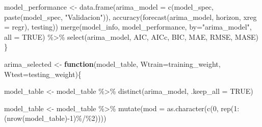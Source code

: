 \documentclass[
]{article}
\newenvironment{Shaded}{\begin{snugshade}}{\end{snugshade}}
\newcommand{\AttributeTok}[1]{\textcolor[rgb]{0.77,0.63,0.00}{#1}}
\newcommand{\ConstantTok}[1]{\textcolor[rgb]{0.00,0.00,0.00}{#1}}
\newcommand{\ControlFlowTok}[1]{\textcolor[rgb]{0.13,0.29,0.53}{\textbf{#1}}}
\newcommand{\DecValTok}[1]{\textcolor[rgb]{0.00,0.00,0.81}{#1}}
\newcommand{\FunctionTok}[1]{\textcolor[rgb]{0.00,0.00,0.00}{#1}}
\newcommand{\NormalTok}[1]{#1}
\newcommand{\OtherTok}[1]{\textcolor[rgb]{0.56,0.35,0.01}{#1}}
\newcommand{\SpecialCharTok}[1]{\textcolor[rgb]{0.00,0.00,0.00}{#1}}
\newcommand{\StringTok}[1]{\textcolor[rgb]{0.31,0.60,0.02}{#1}}
\begin{document}
\begin{Shaded}
\begin{Highlighting}[]
\NormalTok{        model\_performance }\OtherTok{\textless{}{-}} \FunctionTok{data.frame}\NormalTok{(}\AttributeTok{arima\_model =} \FunctionTok{c}\NormalTok{(model\_spec, }
                                                        \FunctionTok{paste}\NormalTok{(model\_spec,}
                                                              \StringTok{"Validacion"}\NormalTok{)),}
                                        \FunctionTok{accuracy}\NormalTok{(}\FunctionTok{forecast}\NormalTok{(arima\_model, horizon, }
                                                          \AttributeTok{xreg =}\NormalTok{ regr),}
\NormalTok{                                                 testing))}
        \FunctionTok{merge}\NormalTok{(model\_info, model\_performance, }\AttributeTok{by=}\StringTok{"arima\_model"}\NormalTok{, }\AttributeTok{all =} \ConstantTok{TRUE}\NormalTok{) }\SpecialCharTok{\%\textgreater{}\%}
            \FunctionTok{select}\NormalTok{(arima\_model, AIC, AICc, BIC, MAE, RMSE, MASE)}
\NormalTok{    \}}

\NormalTok{    arima\_selected }\OtherTok{\textless{}{-}} \ControlFlowTok{function}\NormalTok{(model\_table, }\AttributeTok{Wtrain=}\NormalTok{training\_weight, }
                               \AttributeTok{Wtest=}\NormalTok{testing\_weight)\{}

\NormalTok{        model\_table }\OtherTok{\textless{}{-}}\NormalTok{ model\_table }\SpecialCharTok{\%\textgreater{}\%}
            \FunctionTok{distinct}\NormalTok{(arima\_model, }\AttributeTok{.keep\_all =} \ConstantTok{TRUE}\NormalTok{)}

\NormalTok{        model\_table }\OtherTok{\textless{}{-}}\NormalTok{ model\_table }\SpecialCharTok{\%\textgreater{}\%}
            \FunctionTok{mutate}\NormalTok{(}\AttributeTok{mod =} \FunctionTok{as.character}\NormalTok{(}\FunctionTok{c}\NormalTok{(}\DecValTok{0}\NormalTok{, }\FunctionTok{rep}\NormalTok{(}\DecValTok{1}\SpecialCharTok{:}\NormalTok{(}\FunctionTok{nrow}\NormalTok{(model\_table)}\SpecialCharTok{{-}}\DecValTok{1}\NormalTok{)}\SpecialCharTok{\%/\%}\DecValTok{2}\NormalTok{))))}


\end{Highlighting}
\end{Shaded}
\end{document}
